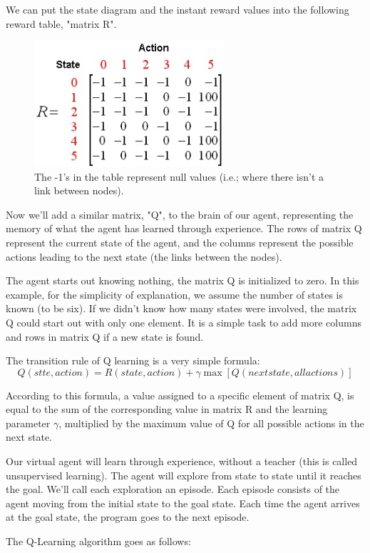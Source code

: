 \documentclass[a4paper, 11pt]{article}
\begin{document}
We can put the state diagram and the instant reward values into the following reward table, "matrix R".

\begin{figure}[H]
\centering
\includegraphics[width=7cm]{fig/r_matrix1}
\caption*{The -1's in the table represent null values (i.e.; where there isn't a link between nodes). }
\end{figure}

Now we'll add a similar matrix, "Q", to the brain of our agent, representing the memory of what the agent has learned through experience.  The rows of matrix Q represent the current state of the agent, and the columns represent the possible actions leading to the next state (the links between the nodes).

The agent starts out knowing nothing, the matrix Q is initialized to zero.  In this example, for the simplicity of explanation, we assume the number of states is known (to be six).  If we didn't know how many states were involved, the matrix Q could start out with only one element.  It is a simple task to add more columns and rows in matrix Q if a new state is found.

The transition rule of Q learning is a very simple formula:
$$Q(stte,action)=R(state,action)+\gamma\max[Q(next state,allactions)]$$

According to this formula, a value assigned to a specific element of matrix Q, is equal to the sum of the corresponding value in matrix R and the learning parameter $\gamma$, multiplied by the maximum value of Q for all possible actions in the next state.

Our virtual agent will learn through experience, without a teacher (this is called unsupervised learning).  The agent will explore from state to state until it reaches the goal. We'll call each exploration an episode.  Each episode consists of the agent moving from the initial state to the goal state.  Each time the agent arrives at the goal state, the program goes to the next episode.

The Q-Learning algorithm goes as follows:
\end{document}
